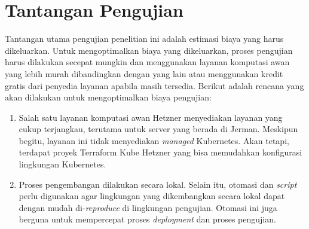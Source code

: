 \section{Tantangan Pengujian}

Tantangan utama pengujian penelitian ini adalah estimasi biaya yang harus dikeluarkan. Untuk mengoptimalkan biaya yang dikeluarkan, proses pengujian harus dilakukan secepat mungkin dan menggunakan layanan komputasi awan yang lebih murah dibandingkan dengan yang lain atau menggunakan kredit gratis dari penyedia layanan apabila masih tersedia. Berikut adalah rencana yang akan dilakukan untuk mengoptimalkan biaya pengujian:

\begin{enumerate}
    \item Salah satu layanan komputasi awan Hetzner menyediakan layanan yang cukup terjangkau, terutama untuk server yang berada di Jerman. Meskipun begitu, layanan ini tidak menyediakan \textit{managed} Kubernetes. Akan tetapi, terdapat proyek Terraform Kube Hetzner yang bisa memudahkan konfigurasi lingkungan Kubernetes.
    \item Proses pengembangan dilakukan secara lokal. Selain itu, otomasi dan \textit{script} perlu digunakan agar lingkungan yang dikembangkan secara lokal dapat dengan mudah di-\textit{reproduce} di lingkungan pengujian. Otomasi ini juga berguna untuk mempercepat proses \textit{deployment} dan proses pengujian.
\end{enumerate}